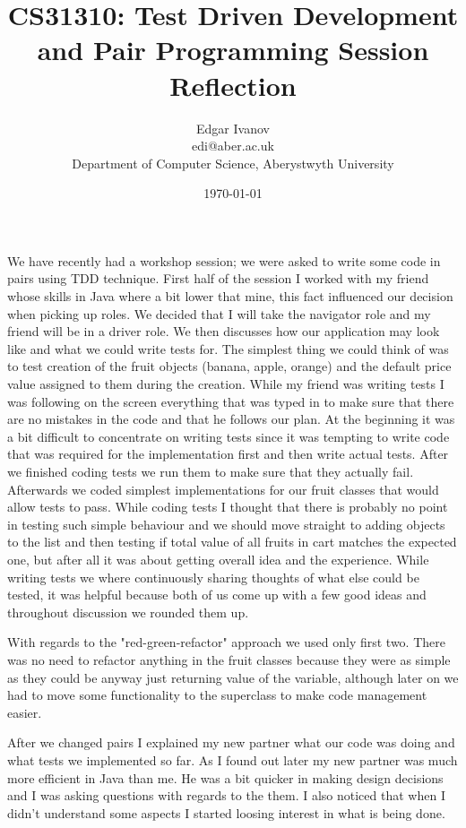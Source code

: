 \documentclass[]{report}
\begin{document}
\title{CS31310: Test Driven Development and Pair Programming Session Reflection}
\author{Edgar Ivanov\\ edi@aber.ac.uk \\ Department of Computer Science, Aberystwyth University}
\date{\today}
\maketitle
We have recently had a workshop session; we were asked to write some code in pairs using TDD technique. First half of the session I worked with my friend whose skills in Java where a bit lower that mine, this fact influenced our decision when picking up roles. We decided that I will take the navigator role and my friend will be in a driver role. We then discusses how our application may look like and what we could write tests for. The simplest thing we could think of was to test creation of the fruit objects (banana, apple, orange) and the default price value assigned to them during the creation. While my friend was writing tests I was following on the screen everything that was typed in to make sure that there are no mistakes in the code and that he follows our plan.  At the beginning it was a bit difficult to concentrate on writing tests since it was tempting to write code that was required for the implementation first and then write actual tests. After we finished coding tests we run them to make sure that they actually fail. Afterwards we coded simplest implementations for our fruit classes that would allow tests to pass. While coding tests I thought that there is probably no point in testing such simple behaviour and we should move straight to adding objects to the list and then testing if total value of all fruits in cart matches the expected one, but after all it was about getting overall idea and the experience. While writing tests we where continuously sharing thoughts of what else could be tested, it was helpful because both of us come up with a few good ideas and throughout discussion we rounded them up. 


With regards to the "red-green-refactor" approach we used only first two. There was no need to refactor anything in the fruit classes because they were as simple as they could be anyway just returning value of the variable, although later on we had to move some functionality to the superclass to make code management easier. 


After we changed pairs I explained my new partner what our code was doing and what tests we implemented so far. As I found out later my new partner was much more efficient in Java than me. He was a bit quicker in making design decisions and I was asking questions with regards to the them. I also noticed that when I didn't understand some aspects I started loosing interest in what is being done.
\end{document}
